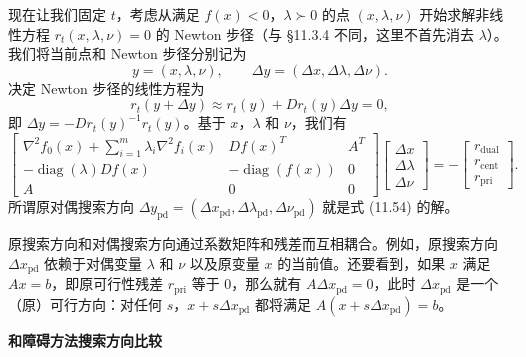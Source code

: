 \documentclass[UTF8, 12pt, fontset=fandol, oneside]{ctexart}
\begin{document}
现在让我们固定 $t$，考虑从满足 $f(x)<0$，$\lambda\succ 0$ 的点 $(x,\lambda,\nu)$ 开始求解非线性方程 $r_t(x,\lambda,\nu)=0$ 的 Newton 步径（与 \S 11.3.4 不同，这里不首先消去 $\lambda$）。我们将当前点和 Newton 步径分别记为
\[
y=(x,\lambda,\nu),\qquad \Delta y=(\Delta x,\Delta\lambda,\Delta\nu).
\]
决定 Newton 步径的线性方程为
\[
r_t(y+\Delta y)\approx r_t(y)+Dr_t(y)\Delta y=0,
\]
即 $\Delta y=-Dr_t(y)^{-1}r_t(y)$。基于 $x$，$\lambda$ 和 $\nu$，我们有
\begin{equation}
\begin{bmatrix}
\nabla^2 f_0(x)+\sum_{i=1}^m\lambda_i\nabla^2f_i(x) & Df(x)^T & A^T\\
-\operatorname{diag}(\lambda)Df(x) & -\operatorname{diag}(f(x)) & 0\\
A & 0 & 0
\end{bmatrix}
\begin{bmatrix}
\Delta x\\
\Delta\lambda\\
\Delta\nu
\end{bmatrix}
=-
\begin{bmatrix}
r_{\mathrm{dual}}\\
r_{\mathrm{cent}}\\
r_{\mathrm{pri}}
\end{bmatrix}.
\tag{11.54}
\end{equation}
所谓原对偶搜索方向 $\Delta y_{\mathrm{pd}}=(\Delta x_{\mathrm{pd}},\Delta\lambda_{\mathrm{pd}},\Delta\nu_{\mathrm{pd}})$ 就是式 (11.54) 的解。

原搜索方向和对偶搜索方向通过系数矩阵和残差而互相耦合。例如，原搜索方向 $\Delta x_{\mathrm{pd}}$ 依赖于对偶变量 $\lambda$ 和 $\nu$ 以及原变量 $x$ 的当前值。还要看到，如果 $x$ 满足 $Ax=b$，即原可行性残差 $r_{\mathrm{pri}}$ 等于 0，那么就有 $A\Delta x_{\mathrm{pd}}=0$，此时 $\Delta x_{\mathrm{pd}}$ 是一个（原）可行方向：对任何 $s$，$x+s\Delta x_{\mathrm{pd}}$ 都将满足 $A(x+s\Delta x_{\mathrm{pd}})=b$。

\noindent\textbf{和障碍方法搜索方向比较}
\end{document}
